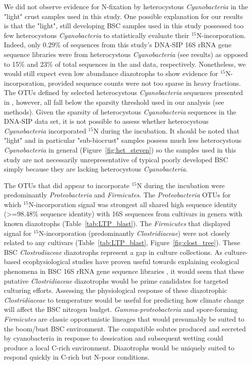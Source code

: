 We did not observe evidence for N-fixation by heterocystous
\textit{Cyanobacteria} in the "light" crust samples used in this study. One
possible explanation for our results is that the "light", still developing
BSC samples used in this study possessed too few heterocystous
\textit{Cyanobacteria} to statistically evaluate their $^{15}$N-incorporation.
Indeed, only 0.29\% of sequences from this study's DNA-SIP 16S rRNA gene
sequence libraries were from heterocystous \textit{Cyanobacteria} (see results)
as opposed to 15\% and 23\% of total sequences in the \citet{Steven_2013} and
\citet{Garcia_Pichel_2013} data, respectively.  Nonetheless, we would still
expect even low abundance diazotrophs to show
evidence for $^{15}$N-incorporation, provided sequence counts were not too
sparse in heavy fractions. The OTUs defined by selected heterocystous
\textit{Cyanobacteria} sequences presented in \citet{Yeager}, however, all
fall below the sparsity threshold used in our analysis (see methods). Given the
sparsity of heterocystous \textit{Cyanobacteria} sequences in the DNA-SIP data
set, it is not possible
to assess whether heterocystous \textit{Cyanobacteria} incorporated $^{15}$N
during the incubation. It should be noted that "light" and in particular
"sub-biocrust" samples possess much less heterocystous \textit{Cyanobacteria}
in general (Figure~\ref{fig:het_steven}) so the samples used in this study are
not necessarily unrepresentative of typical poorly developed BSC simply because
they are lacking heterocystous \textit{Cyanobacteria}. 

The OTUs that did appear to incorporate $^{15}$N during the incubation were
predominantly \textit{Proteobacteria} and \textit{Firmicutes}. The
\textit{Proteobacteria} OTUs for which $^{15}$N-incorporation signal was
strongest all shared high sequence identity (\textgreater=98.48\% sequence
identity) with 16S sequences from cultivars in genera with known diazotrophs
(Table~\ref{tab:LTP_blast}). The \textit{Firmicutes} that displayed signal
for $^{15}$N-incorporation (predominantly \textit{Clostridiaceae}) were not
closely related to any cultivars (Table~\ref{tab:LTP_blast},
Figure~\ref{fig:clost_tree}). These BSC \textit{Clostrodiaceae} diazotrophs
represent a gap in culture collections. As culture-based ecophysiological
studies have proven useful towards explaining ecological phenomena in BSC 16S
rRNA gene sequence libraries \citep{Garcia_Pichel_2013}, it would seem that
these putative \textit{Clostridiaceae} diazotrophs would be prime candidates
for targeted culturing efforts. Assessing the physiological response of these
diazotrophic \textit{Clostridiaceae} to temperature would be useful for
predicting how climate change will affect the BSC nitrogen budget.
\textit{Gamma-proteobacteria} and spore-forming \textit{Firmicutes} are classic
opportunistic lineages that would presumably be suited to the boom/bust BSC
environment. The compatible solutes produced and secreted by cyanobacteria in
response to dessication and subsequent wetting could produce a local C-rich
environment. Diazotrophs would be uniquely suited to respond quickly in C-rich
but N-poor conditions. 

